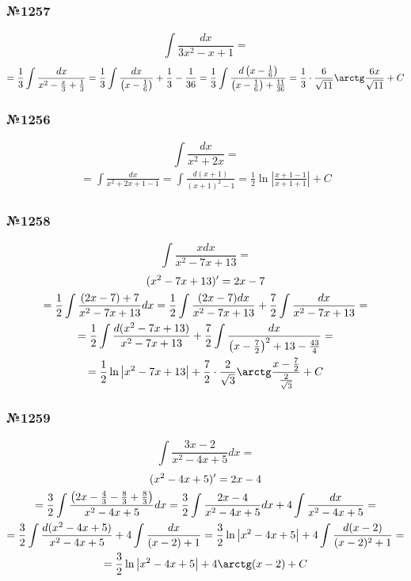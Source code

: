 \documentclass{article}
\begin{document}
\subsubsection{№1257}
\[
    \int \frac{dx}{3x^2 - x + 1} =
\]
\begin{gather*}
    = \frac{1}{3} \int \frac{dx}{x^2 - \frac{x}{3} + \frac{1}{3}} =
      \frac{1}{3} \int \frac{dx}{\left(x - \frac{1}{6}\right)} + \frac{1}{3} - \frac{1}{36} =
      \frac{1}{3} \int \frac{d\left(x - \frac{1}{6}\right)}{\left(x - \frac{1}{6}\right) + \frac{11}{36}} =
      \frac{1}{3} \cdot \frac{6}{\sqrt{11}} \arctg \frac{6x}{\sqrt{11}} + C
\end{gather*}

\subsubsection{№1256}
\[
    \int \frac{dx}{x^2 + 2x} = 
\]
\begin{gather*}
    = \int \frac{dx}{x^2 + 2x + 1 - 1} =
      \int \frac{d(x + 1)}{(x + 1)^2 - 1} =
      \frac{1}{2} \ln \left|\frac{x + 1 - 1}{x + 1 + 1}\right| + C
\end{gather*}

\subsubsection{№1258}
\[
    \int \frac{xdx}{x^2 - 7x + 13} =
\]
\begin{gather*}
    (x^2 - 7x + 13)' = 2x - 7 \\
    = \frac{1}{2} \int \frac{(2x - 7) + 7}{x^2 - 7x + 13} dx =
      \frac{1}{2} \int \frac{(2x - 7) dx}{x^2 - 7x + 13} + \frac{7}{2} \int \frac{dx}{x^2 - 7x + 13} = \\
    = \frac{1}{2} \int \frac{d(x^2 - 7x + 13)}{x^2 - 7x  + 13} + 
      \frac{7}{2} \int \frac{dx}{\left(x - \frac{7}{2}\right)^2 + 13 - \frac{43}{4}} = \\
    = \frac{1}{2} \ln \left|x^2 - 7x + 13\right| + 
      \frac{7}{2} \cdot \frac{2}{\sqrt{3}} \arctg \frac{x - \frac{7}{2}}{\frac{2}{\sqrt{3}}} + C
\end{gather*}

\subsubsection{№1259}
\[
    \int \frac{3x - 2}{x^2 - 4x + 5} dx = 
\]
\begin{gather*}
    (x^2 - 4x + 5)' = 2x - 4 \\
    = \frac{3}{2} \int \frac{\left(2x - \frac{4}{3} - \frac{8}{3} + \frac{8}{3}\right)}{x^2 - 4x + 5} dx =
      \frac{3}{2} \int \frac{2x - 4}{x^2 - 4x + 5} dx + 4 \int \frac{dx}{x^2 - 4x + 5} = \\
    = \frac{3}{2} \int \frac{d(x^2 - 4x + 5)}{x^2 - 4x + 5} + 4 \int \frac{dx}{(x - 2) + 1} =
      \frac{3}{2} \ln \left|x^2 - 4x + 5\right| + 4 \int \frac{d(x - 2)}{(x - 2)^2 + 1} = \\
    = \frac{3}{2} \ln \left|x^2 - 4x + 5\right| + 4 \arctg (x - 2) + C
\end{gather*}
\end{document}
